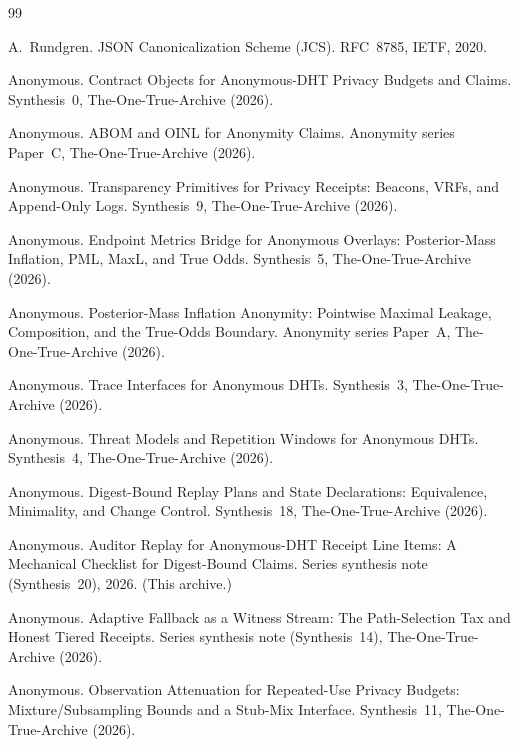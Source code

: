 \documentclass[11pt]{article}
\begin{document}
\begin{thebibliography}{99}\small


A.~Rundgren.
\newblock JSON Canonicalization Scheme (JCS).
\newblock RFC~8785, IETF, 2020.

Anonymous.
\newblock Contract Objects for Anonymous-DHT Privacy Budgets and Claims.
\newblock Synthesis~0, The-One-True-Archive (2026).

Anonymous.
\newblock ABOM and OINL for Anonymity Claims.
\newblock Anonymity series Paper~C, The-One-True-Archive (2026).

Anonymous.
\newblock Transparency Primitives for Privacy Receipts: Beacons, VRFs, and Append-Only Logs.
\newblock Synthesis~9, The-One-True-Archive (2026).

Anonymous.
\newblock Endpoint Metrics Bridge for Anonymous Overlays: Posterior-Mass Inflation, PML, MaxL, and True Odds.
\newblock Synthesis~5, The-One-True-Archive (2026).

Anonymous.
\newblock Posterior-Mass Inflation Anonymity: Pointwise Maximal Leakage, Composition, and the True-Odds Boundary.
\newblock Anonymity series Paper~A, The-One-True-Archive (2026).

Anonymous.
\newblock Trace Interfaces for Anonymous DHTs.
\newblock Synthesis~3, The-One-True-Archive (2026).

Anonymous.
\newblock Threat Models and Repetition Windows for Anonymous DHTs.
\newblock Synthesis~4, The-One-True-Archive (2026).

Anonymous.
\newblock Digest-Bound Replay Plans and State Declarations: Equivalence, Minimality, and Change Control.
\newblock Synthesis~18, The-One-True-Archive (2026).

Anonymous.
\newblock Auditor Replay for Anonymous-DHT Receipt Line Items: A Mechanical Checklist for Digest-Bound Claims.
\newblock Series synthesis note (Synthesis~20), 2026. (This archive.)

Anonymous.
\newblock Adaptive Fallback as a Witness Stream: The Path-Selection Tax and Honest Tiered Receipts.
\newblock Series synthesis note (Synthesis~14), The-One-True-Archive (2026).

Anonymous.
\newblock Observation Attenuation for Repeated-Use Privacy Budgets: Mixture/Subsampling Bounds and a Stub-Mix Interface.
\newblock Synthesis~11, The-One-True-Archive (2026).


\end{thebibliography}
\end{document}
